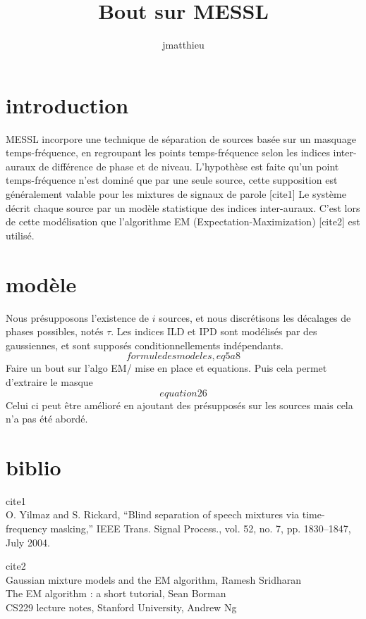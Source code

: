 \documentclass[a4paper,12pt,twocols]{article}
\title{Bout sur MESSL}
\author{jmatthieu}
\begin{document}
\maketitle

\section{introduction}
MESSL incorpore une technique de séparation de sources basée sur un masquage temps-fréquence, en regroupant les points temps-fréquence selon les indices inter-auraux de différence de phase et de niveau. L'hypothèse est faite qu'un point temps-fréquence n'est dominé que par une seule source, cette supposition est généralement valable pour les mixtures de signaux de parole [cite1] Le système décrit chaque source par un modèle statistique des indices inter-auraux. C'est lors de cette modélisation que l'algorithme EM (Expectation-Maximization) [cite2] est utilisé.
\section{modèle}
Nous présupposons l'existence de $i$ sources, et nous discrétisons les décalages de phases possibles, notés $\tau$. Les indices ILD et IPD sont modélisés par des gaussiennes, et sont supposés conditionnellements indépendants.
$$ formule des modeles,eq5a8$$
Faire un bout sur l'algo EM/ mise en place et equations.
Puis cela permet d'extraire le masque
$$equation26$$
Celui ci peut être amélioré en ajoutant des présupposés sur les sources mais cela n'a pas été abordé.

\section{biblio}
cite1 \\ O. Yilmaz and S. Rickard, “Blind separation of speech mixtures via
time-frequency masking,” IEEE Trans. Signal Process., vol. 52, no. 7,
pp. 1830–1847, July 2004.


cite2 \\
Gaussian mixture models and the EM algorithm, Ramesh Sridharan\\
The EM algorithm : a short tutorial, Sean Borman\\
CS229 lecture notes, Stanford University, Andrew Ng\\
\end{document}
